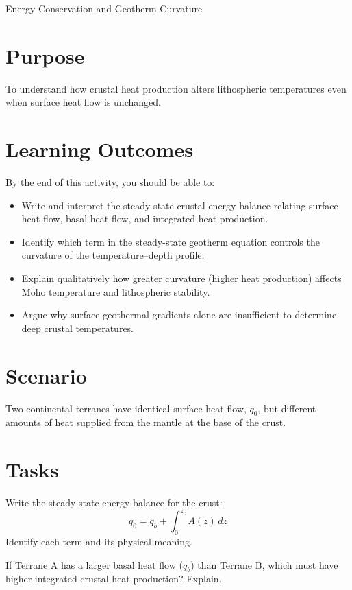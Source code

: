 \begin{activity}{Energy Conservation and Geotherm Curvature}

\section*{Purpose}
To understand how crustal heat production alters lithospheric temperatures even when surface heat flow is unchanged.

{\color{red}
\section*{Learning Outcomes}

By the end of this activity, you should be able to:
\begin{itemize}
  \item Write and interpret the steady-state crustal energy balance relating surface heat flow, basal heat flow, and integrated heat production.
  \item Identify which term in the steady-state geotherm equation controls the curvature of the temperature--depth profile.
  \item Explain qualitatively how greater curvature (higher heat production) affects Moho temperature and lithospheric stability.
  \item Argue why surface geothermal gradients alone are insufficient to determine deep crustal temperatures.
\end{itemize}
}

\section*{Scenario}
Two continental terranes have identical surface heat flow, $q_0$, but different
amounts of heat supplied from the mantle at the base of the crust.

\section*{Tasks}

\begin{questions}
  \question{}
  Write the steady-state energy balance for the crust:
  \[
    q_0 = q_b + \int_0^{z_c} A(z)\,dz
  \]
  Identify each term and its physical meaning.
  \answerbox[3cm]

  \item If Terrane A has a larger basal heat flow ($q_b$) than Terrane B, which must have higher integrated crustal heat production? Explain.
  \answerbox[3cm]


\end{questions}
\end{activity}
